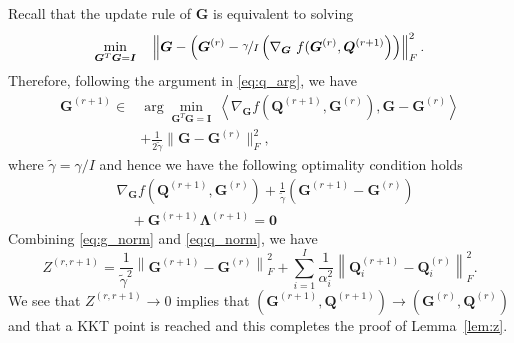 \documentclass[10pt,journal]{IEEEtran}
\newcommand{\G}{\boldsymbol{G}}
\newcommand{\Q}{\boldsymbol{Q}}
\newcommand{\X}{\boldsymbol{X}}
\begin{document}
Recall that the update rule of $\G$ is equivalent to solving
\begin{equation}\label{eq:G_projgrad}
\begin{aligned}
\min_{\G^T\G=\bm I}\quad \left\|\G - \left(\G^{(r)} -\nicefrac{\gamma}{I} \left(\nabla_{\G}~f(\G^{(r)},\Q^{(r+1)}\right)\right)\right\|_F^2.
\end{aligned}
\end{equation}
Therefore, following the argument in \eqref{eq:q_arg}, we have
\begin{equation}\label{eq:g_arg}
\begin{aligned}
\G^{(r+1)} \in& \arg\min_{\G^T\G={\bm I}}~ \left<\nabla_{\G}f(\Q^{(r+1)},\G^{(r)}),\G -\G^{(r)}\right>\\ &+\frac{1}{2\tilde{\gamma}}\|\G-\G^{(r)}\|_F^2,
\end{aligned}
\end{equation}
where $\tilde{\gamma}=\gamma/I$ and hence we have the following optimality condition holds
\begin{align}
&\nabla_{\G}f(\Q^{(r+1)},\G^{(r)}) +\frac{1}{\tilde{\gamma}}\left(\G^{(r+1)} -\G^{(r)}\right) \nonumber\\
& \quad+ \G^{(r+1)}{\bm\Lambda}^{(r+1)}={\bm 0} \label{eq:g_norm}
\end{align}
Combining \eqref{eq:g_norm} and \eqref{eq:q_norm}, we have
\begin{equation}
Z^{(r,r+1)} = \frac{1}{\tilde{\gamma}^2}  \left\|\G^{(r+1)} -\G^{(r)}\right\|_F^2 + \sum_{i=1}^I\frac{1}{\alpha_i^2}\left\|\Q_i^{(r+1)}-\Q_i^{(r)}\right\|_F^2.
\end{equation}
We see that $Z^{(r,r+1)}\rightarrow 0$ implies that $(\G^{(r+1)},\Q^{(r+1)})\rightarrow (\G^{(r)},\Q^{(r)})$ and that a KKT point is reached and this completes the proof of Lemma~\ref{lem:z}.
\end{document}

